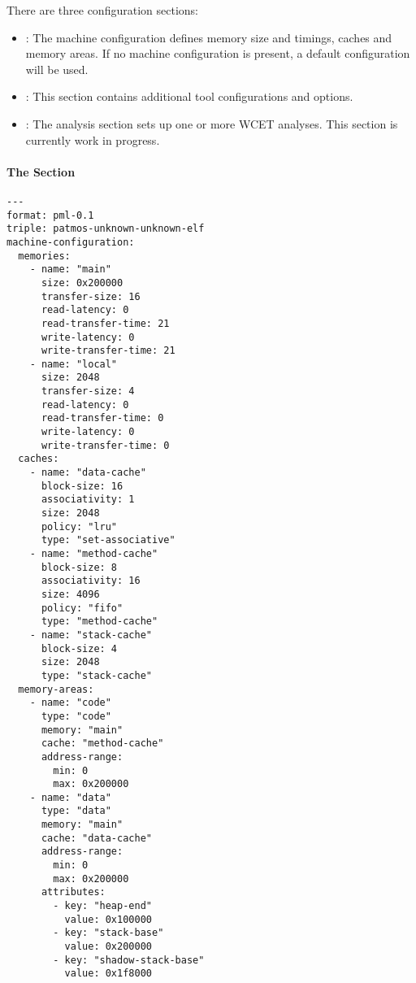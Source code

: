 There are three configuration sections: 
\begin{itemize}
\item {}: The machine configuration defines memory size and timings, caches and memory areas.
  If no machine configuration is present, a default configuration will be used.
\item {}: This section contains additional tool configurations and options.
\item {}: The analysis section sets up one or more WCET analyses. This section is currently work in progress.
\end{itemize}

\paragraph{The  Section}


\begin{verbatim}
---
format: pml-0.1
triple: patmos-unknown-unknown-elf
machine-configuration:
  memories:
    - name: "main"
      size: 0x200000
      transfer-size: 16
      read-latency: 0
      read-transfer-time: 21
      write-latency: 0
      write-transfer-time: 21
    - name: "local"
      size: 2048
      transfer-size: 4
      read-latency: 0
      read-transfer-time: 0
      write-latency: 0
      write-transfer-time: 0
  caches:
    - name: "data-cache"
      block-size: 16
      associativity: 1
      size: 2048
      policy: "lru"
      type: "set-associative"
    - name: "method-cache"
      block-size: 8
      associativity: 16
      size: 4096
      policy: "fifo"
      type: "method-cache"
    - name: "stack-cache"
      block-size: 4
      size: 2048
      type: "stack-cache"
  memory-areas:
    - name: "code"
      type: "code"
      memory: "main"
      cache: "method-cache"
      address-range:
        min: 0
        max: 0x200000
    - name: "data"
      type: "data"
      memory: "main"
      cache: "data-cache"
      address-range:
        min: 0
        max: 0x200000
      attributes:
        - key: "heap-end"
          value: 0x100000
        - key: "stack-base"
          value: 0x200000
        - key: "shadow-stack-base"
          value: 0x1f8000
\end{verbatim}


